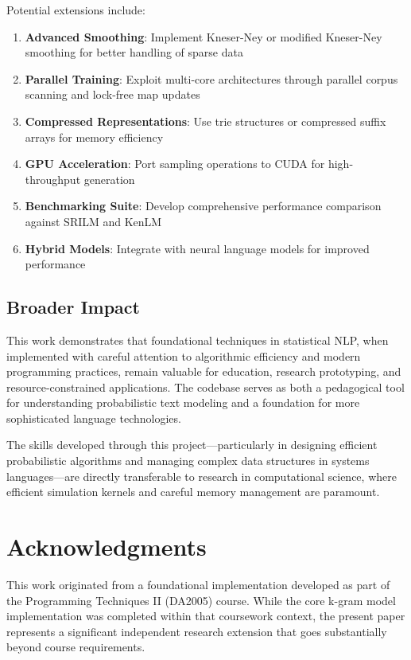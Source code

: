 \documentclass[11pt,letterpaper]{article}
\begin{document}
Potential extensions include:

\begin{enumerate}
    \item \textbf{Advanced Smoothing}: Implement Kneser-Ney or modified Kneser-Ney smoothing for better handling of sparse data
    \item \textbf{Parallel Training}: Exploit multi-core architectures through parallel corpus scanning and lock-free map updates
    \item \textbf{Compressed Representations}: Use trie structures or compressed suffix arrays for memory efficiency
    \item \textbf{GPU Acceleration}: Port sampling operations to CUDA for high-throughput generation
    \item \textbf{Benchmarking Suite}: Develop comprehensive performance comparison against SRILM and KenLM
    \item \textbf{Hybrid Models}: Integrate with neural language models for improved performance
\end{enumerate}

\subsection{Broader Impact}

This work demonstrates that foundational techniques in statistical NLP, when implemented with careful attention to algorithmic efficiency and modern programming practices, remain valuable for education, research prototyping, and resource-constrained applications. The codebase serves as both a pedagogical tool for understanding probabilistic text modeling and a foundation for more sophisticated language technologies.

The skills developed through this project—particularly in designing efficient probabilistic algorithms and managing complex data structures in systems languages—are directly transferable to research in computational science, where efficient simulation kernels and careful memory management are paramount.

\section*{Acknowledgments}

This work originated from a foundational implementation developed as part of the Programming Techniques II (DA2005) course. While the core k-gram model implementation was completed within that coursework context, the present paper represents a significant independent research extension that goes substantially beyond course requirements.
\end{document}

